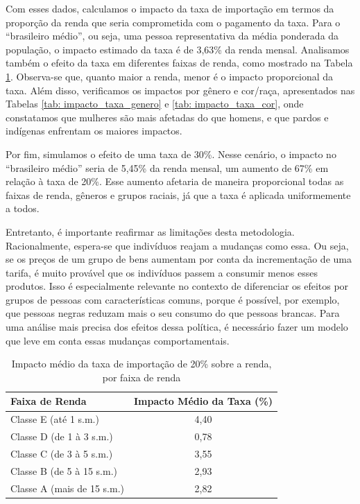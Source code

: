 \documentclass[12pt]{article}
\theoremstyle{break}
\begin{document}
Com esses dados, calculamos o impacto da taxa de importação em termos da proporção da renda que seria comprometida com o pagamento da taxa. Para o ``brasileiro médio'', ou seja, uma pessoa representativa da média ponderada da população, o impacto estimado da taxa é de 3,63\% da renda mensal. Analisamos também o efeito da taxa em diferentes faixas de renda, como mostrado na Tabela \ref{tab: impacto_taxa}. Observa-se que, quanto maior a renda, menor é o impacto proporcional da taxa. Além disso, verificamos os impactos por gênero e cor/raça, apresentados nas Tabelas \ref{tab: impacto_taxa_genero} e \ref{tab: impacto_taxa_cor}, onde constatamos que mulheres são mais afetadas do que homens, e que pardos e indígenas enfrentam os maiores impactos.

Por fim, simulamos o efeito de uma taxa de 30\%. Nesse cenário, o impacto no ``brasileiro médio'' seria de 5,45\% da renda mensal, um aumento de 67\% em relação à taxa de 20\%. Esse aumento afetaria de maneira proporcional todas as faixas de renda, gêneros e grupos raciais, já que a taxa é aplicada uniformemente a todos.

Entretanto, é importante reafirmar as limitações desta metodologia. Racionalmente, espera-se que indivíduos reajam a mudanças como essa. Ou seja, se os preços de um grupo de bens aumentam por conta da incrementação de uma tarifa, é muito provável que os indivíduos passem a consumir menos esses produtos. Isso é especialmente relevante no contexto de diferenciar os efeitos por grupos de pessoas com características comuns, porque é possível, por exemplo, que pessoas negras reduzam mais o seu consumo do que pessoas brancas. Para uma análise mais precisa dos efeitos dessa política, é necessário fazer um modelo que leve em conta essas mudanças comportamentais.

\begin{table}[H]
\centering
\begin{tabular}{l|c}
\textbf{Faixa de Renda} & \textbf{Impacto Médio da Taxa (\%)} \\ \hline
Classe E (até 1 s.m.)                     & 4,40                               \\ \hline
Classe D (de 1 à 3 s.m.)                   & 0,78                              \\ \hline
Classe C (de 3 à 5 s.m.)                  & 3,55                              \\ \hline
Classe B (de 5 à 15 s.m.)                 & 2,93                              \\ \hline
Classe A (mais de 15 s.m.)                & 2,82
\end{tabular}
\caption{Impacto médio da taxa de importação de 20\% sobre a renda, por faixa de renda}
\label{tab: impacto_taxa}
\end{table}
\end{document}
